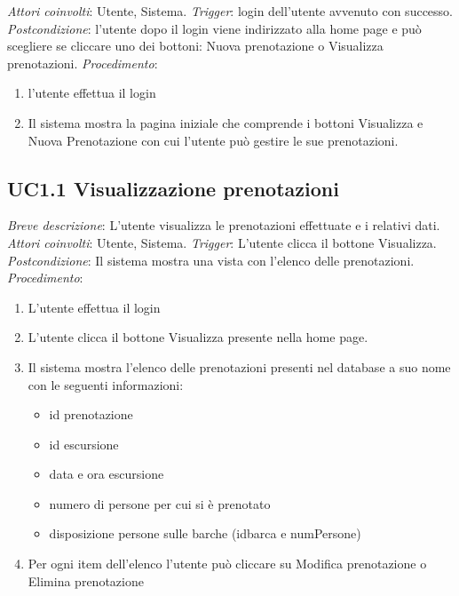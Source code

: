 \noindent \emph{Attori coinvolti}: Utente, Sistema.\medbreak
\noindent \emph{Trigger}: login dell'utente avvenuto con successo.\medbreak
\noindent \emph{Postcondizione}: l'utente dopo il login viene indirizzato alla home page e può scegliere se cliccare uno dei bottoni: Nuova prenotazione o Visualizza prenotazioni.\medbreak
\noindent \emph{Procedimento}:
\begin{enumerate}
    \item l'utente effettua il login
    \item Il sistema mostra la pagina iniziale che comprende i bottoni Visualizza e Nuova Prenotazione con cui l'utente può gestire le sue prenotazioni.
\end{enumerate}

\subsection{UC1.1 Visualizzazione prenotazioni}
\noindent \emph{Breve descrizione}: L'utente visualizza le prenotazioni effettuate e i relativi dati.\medbreak
\noindent \emph{Attori coinvolti}: Utente, Sistema.\medbreak
\noindent \emph{Trigger}: L'utente clicca il bottone Visualizza.\medbreak
\noindent \emph{Postcondizione}: Il sistema mostra una vista con l'elenco delle prenotazioni.\medbreak
\noindent \emph{Procedimento}:

\begin{enumerate}
    \item L'utente effettua il login
    \item L'utente clicca il bottone Visualizza presente nella home page.
    \item Il sistema mostra l'elenco delle prenotazioni presenti nel database a suo nome con le seguenti informazioni:
    \begin{itemize}
        \item id prenotazione
        \item id escursione
        \item data e ora escursione
        \item numero di persone per cui si è prenotato
        \item disposizione persone sulle barche (idbarca e numPersone)
    \end{itemize}
    \item Per ogni item dell'elenco l'utente può cliccare su Modifica prenotazione o Elimina prenotazione
\end{enumerate}

